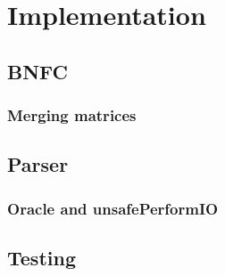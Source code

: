 \chapter{Implementation}

\section{BNFC}
\subsection{Merging matrices}

\section{Parser}
\subsection{Oracle and unsafePerformIO}

\section{Testing}

